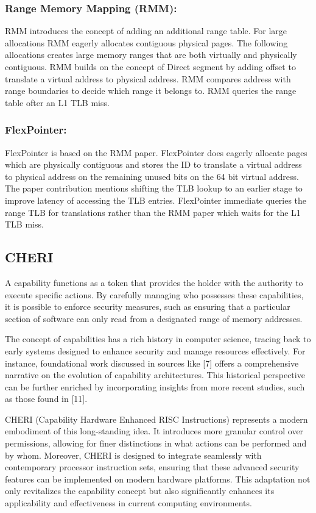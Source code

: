 \documentclass[acmsmall,screen,review]{acmart}
\begin{document}
\subsubsection{Range Memory Mapping (RMM):}
RMM\cite{karakostas_redundant_2015} introduces the concept of adding an additional range table.
For large allocations RMM eagerly allocates contiguous physical pages.
The following allocations creates large memory ranges that are
both virtually and physically contiguous. RMM builds on the concept
of Direct segment by adding offset to translate a virtual address 
to physical address. RMM compares address with range boundaries 
to decide which range it belongs to. RMM queries the range table 
ofter an L1 TLB miss.

\subsubsection{FlexPointer:}
FlexPointer\cite{chen_flexpointer_2023} is based on the RMM\cite{karakostas_redundant_2015} paper. FlexPointer
does eagerly allocate pages which are physically contiguous and stores the ID to translate a virtual address 
to physical address on the remaining unused bits on the 64 bit virtual address. 
The paper contribution mentions shifting the TLB lookup to an earlier stage to improve
latency of accessing the TLB entries. FlexPointer immediate queries the 
range TLB for translations rather than the RMM paper which waits for the L1 TLB miss.

\subsection{CHERI}
A capability functions as a token that provides the holder with the authority to 
execute specific actions. By carefully managing who possesses these capabilities, 
it is possible to enforce security measures, such as ensuring that a particular
section of software can only read from a designated range of memory addresses.

The concept of capabilities has a rich history in computer science, tracing 
back to early systems designed to enhance security and manage resources effectively.
For instance, foundational work discussed in sources like [7] offers a comprehensive 
narrative on the evolution of capability architectures. This historical perspective 
can be further enriched by incorporating insights from more recent studies, 
such as those found in [11].

CHERI (Capability Hardware Enhanced RISC Instructions) represents a modern embodiment of this 
long-standing idea. It introduces more granular control over permissions, allowing for finer 
distinctions in what actions can be performed and by whom. Moreover, CHERI is designed to integrate 
seamlessly with contemporary processor instruction sets, ensuring that these advanced security 
features can be implemented on modern hardware platforms. This adaptation not only revitalizes 
the capability concept but also significantly enhances its applicability and effectiveness 
in current computing environments.
\end{document}
